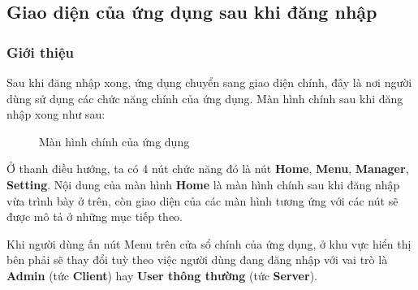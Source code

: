 \subsection{Giao diện của ứng dụng sau khi đăng nhập}
\subsubsection{Giới thiệu}
Sau khi đăng nhập xong, ứng dụng chuyển sang giao diện chính, đây là nơi người dùng sử dụng các chức năng chính của ứng dụng. Màn hình chính sau khi đăng nhập xong như sau:
\begin{figure}[H]
	\caption{Màn hình chính của ứng dụng}
	\label{fig:MainWindow}
\end{figure}
Ở thanh điều hướng, ta có 4 nút chức năng đó là nút \textbf{Home}, \textbf{Menu}, \textbf{Manager}, \textbf{Setting}. Nội dung của màn hình \textbf{Home} là màn hình chính sau khi đăng nhập vừa trình bày ở trên, còn giao diện của các màn hình tương ứng với các nút sẽ được mô tả ở những mục tiếp theo.

Khi người dùng ấn nút Menu trên cửa sổ chính của ứng dụng, ở khu vực hiển thị bên phải sẽ thay đổi tuỳ theo việc người dùng đang đăng nhập với vai trò là \textbf{Admin} (tức \textbf{Client}) hay \textbf{User thông thường} (tức \textbf{Server}).
